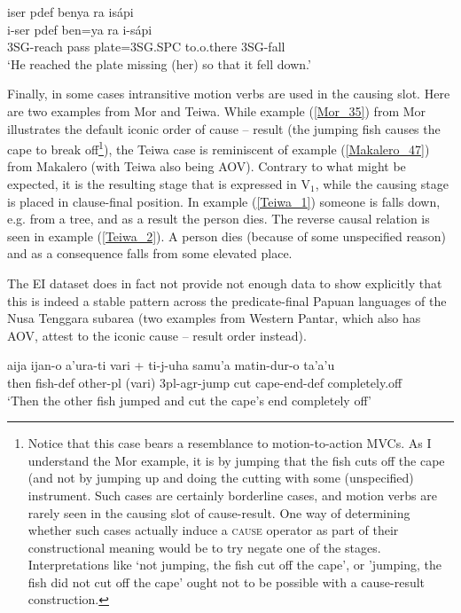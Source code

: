 \ea \label{Biak_43}
\gll iser pdef benya ra isápi \\
i-ser pdef ben=ya ra i-sápi \\
\glc 3SG-reach pass plate=3SG.SPC to.o.there 3SG-fall \\
\glft `He reached the plate missing (her) so that it fell down.' \\ 
\z
\xe

Finally, in some cases intransitive motion verbs are used in the causing slot. Here are two examples from Mor and Teiwa. While example (\ref{Mor_35}) from Mor illustrates the default iconic order of cause -- result (the jumping fish causes the cape to break off\footnote{Notice that this case bears a resemblance to motion-to-action MVCs. As I understand the Mor example, it is by jumping that the fish cuts off the cape (and not by jumping up and doing the cutting with some (unspecified) instrument. Such cases are certainly borderline cases, and motion verbs are rarely seen in the causing slot of cause-result. One way of determining whether such cases actually induce a \textsc{cause} operator as part of their constructional meaning would be to try negate one of the stages. Interpretations like `not jumping, the fish cut off the cape', or 'jumping, the fish did not cut off the cape' ought not to be possible with a cause-result construction.}), the Teiwa case is reminiscent of example (\ref{Makalero_47}) from Makalero (with Teiwa also being AOV). Contrary to what might be expected, it is the resulting stage that is expressed in V$_1$, while the causing stage is placed in clause-final position. In example (\ref{Teiwa_1}) someone is falls down, e.g. from a tree, and as a result the person dies. The reverse causal relation is seen in example (\ref{Teiwa_2}). A person dies (because of some unspecified reason) and as a consequence falls from some elevated place. 

The EI dataset does in fact not provide not enough data to show explicitly that this is indeed a stable pattern across the predicate-final Papuan languages of the Nusa Tenggara subarea (two examples from Western Pantar, which also has AOV, attest to the iconic cause -- result order instead).

\ea \label{Mor_35}
\gll aija ijan-o a'ura-ti vari + ti-j-uha samu'a matin-dur-o ta'a'u \\
then fish-\acs{def} other-\acs{pl} (vari) 3\acs{pl}-\acs{agr}-jump cut cape-end-\acs{def} completely.off \\
\glft `Then the other fish jumped and cut the cape's end completely off' \\ 
\z
\xe

